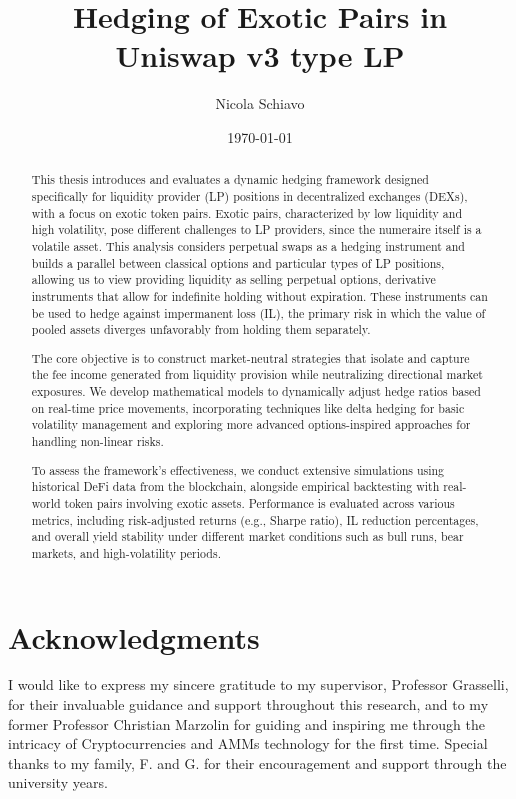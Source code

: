 \documentclass{article}
\title{Hedging of Exotic Pairs in Uniswap v3 type LP}
\author{Nicola Schiavo}
\date{\today}
\begin{document}
\maketitle
\newpage
\begin{abstract}
This thesis introduces and evaluates a dynamic hedging framework designed specifically for liquidity provider (LP) positions in decentralized exchanges (DEXs), with a focus on exotic token pairs. Exotic pairs, characterized by low liquidity and high volatility, pose different challenges to LP providers, since the numeraire itself is a volatile asset. 
This analysis considers perpetual swaps as a hedging instrument and builds a parallel between classical options and particular types of LP positions, allowing us to view providing liquidity as selling perpetual options, derivative instruments that allow for indefinite holding without expiration.
These instruments can be used to hedge against impermanent loss (IL), the primary risk in which the value of pooled assets diverges unfavorably from holding them separately.

The core objective is to construct market-neutral strategies that isolate and capture the fee income generated from liquidity provision while neutralizing directional market exposures. We develop mathematical models to dynamically adjust hedge ratios based on real-time price movements, incorporating techniques like delta hedging for basic volatility management and exploring more advanced options-inspired approaches for handling non-linear risks.

To assess the framework's effectiveness, we conduct extensive simulations using historical DeFi data from the blockchain, alongside empirical backtesting with real-world token pairs involving exotic assets. Performance is evaluated across various metrics, including risk-adjusted returns (e.g., Sharpe ratio), IL reduction percentages, and overall yield stability under different market conditions such as bull runs, bear markets, and high-volatility periods.

\end{abstract}
\newpage
\section*{Acknowledgments}  

I would like to express my sincere gratitude to my supervisor, Professor Grasselli, for their invaluable guidance and support throughout this research, and to my former Professor Christian Marzolin for guiding and inspiring me through the intricacy of Cryptocurrencies and AMMs technology for the first time.\newline
Special thanks to my family, F. and G. for their encouragement and support through the university years.
\end{document}
